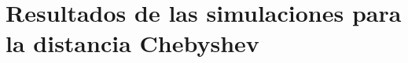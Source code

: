 \documentclass[lettersize, journal]{IEEEtran}
\begin{document}


\section{Resultados de las simulaciones para la distancia Chebyshev}
\end{document}
